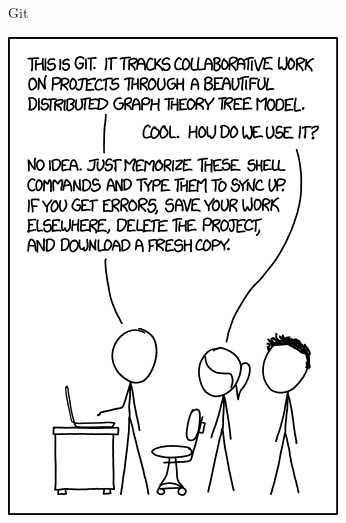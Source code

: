 \documentclass{beamer}
\begin{document}
\begin{frame}{Git}
	\begin{center}
		\includegraphics[width=.4\linewidth]{Images/xkcd.png}
	\end{center}
\end{frame}
\end{document}
